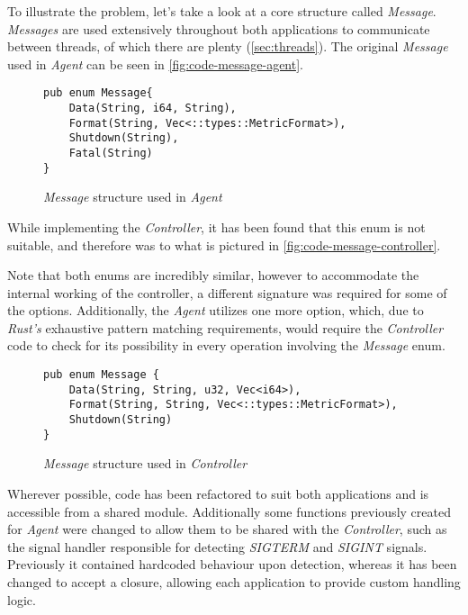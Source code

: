             To illustrate the problem, let's take a look at a core structure called \textit{Message}. \textit{Messages} are used extensively throughout both applications to communicate between threads, of which there are plenty (\autoref{sec:threads}). The original \textit{Message} used in \textit{Agent} can be seen in \autoref{fig:code-message-agent}.
            
            \begin{figure}[!htb]
                \centering
                \begin{BVerbatim}
pub enum Message{
    Data(String, i64, String),
    Format(String, Vec<::types::MetricFormat>),
    Shutdown(String),
    Fatal(String)
}
                \end{BVerbatim}
                \caption{\textit{Message} structure used in \textit{Agent}}
                \label{fig:code-message-agent}
            \end{figure}
            
            While implementing the \textit{Controller}, it has been found that this enum is not suitable, and therefore was to what is pictured in \autoref{fig:code-message-controller}.
            
            Note that both enums are incredibly similar, however to accommodate the internal working of the controller, a different signature was required for some of the options. Additionally, the \textit{Agent} utilizes one more option, which, due to \textit{Rust's} exhaustive pattern matching requirements, would require the \textit{Controller} code to check for its possibility in every operation involving the \textit{Message} enum.
            
            \begin{figure}[!htb]
                \centering
                \begin{BVerbatim}
pub enum Message {
    Data(String, String, u32, Vec<i64>),
    Format(String, String, Vec<::types::MetricFormat>),
    Shutdown(String)
}
                \end{BVerbatim}
                \caption{\textit{Message} structure used in \textit{Controller}}
                \label{fig:code-message-controller}
            \end{figure}
            
            Wherever possible, code has been refactored to suit both applications and is accessible from a shared module. Additionally some functions previously created for \textit{Agent} were changed to allow them to be shared with the \textit{Controller}, such as the signal handler responsible for detecting \textit{SIGTERM} and \textit{SIGINT} signals. Previously it contained hardcoded behaviour upon detection, whereas it has been changed to accept a closure, allowing each application to provide custom handling logic.
        
